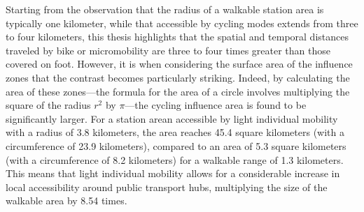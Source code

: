 \begin{refsegment}
Starting from the observation that the radius of a walkable station area is typically one kilometer, while that accessible by cycling modes extends from three to four kilometers, this thesis highlights that the spatial and temporal distances traveled by bike or micromobility are three to four times greater than those covered on foot. However, it is when considering the surface area of the influence zones that the contrast becomes particularly striking. Indeed, by calculating the area of these zones—the formula for the area of a circle involves multiplying the square of the radius \(r^2\) by \(\pi\)—the cycling influence area is found to be significantly larger. For a station arean accessible by light individual mobility with a radius of 3.8 kilometers, the area reaches 45.4 square kilometers (with a circumference of 23.9 kilometers), compared to an area of 5.3 square kilometers (with a circumference of 8.2 kilometers) for a walkable range of 1.3 kilometers. This means that light individual mobility allows for a considerable increase in local accessibility around public transport hubs, multiplying the size of the walkable area by 8.54 times.%


\end{refsegment}

